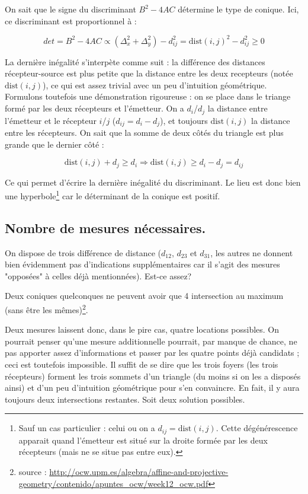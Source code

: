 \documentclass[10pt,a4paper]{article}
\begin{document}
On sait que le signe du discriminant $B^2 - 4AC$ détermine le type de conique. Ici, ce discriminant est proportionnel à :

\begin{equation}
det = B^2 - 4AC \propto (\Delta_x^2 + \Delta_y^2) - d_{ij}^2 = \mathrm{dist}(i,j)^2 - d_{ij}^2\geq 0
\end{equation}

La dernière inégalité s'interpète comme suit : la différence des distances récepteur-source est plus petite que la distance entre les deux recepteurs (notée $\mathrm{dist}(i,j)$), ce qui est assez trivial avec un peu d'intuition géométrique. Formulons toutefois une démonstration rigoureuse : on se place dans le triange formé par les deux récepteurs et l'émetteur. On a $d_i$/$d_j$ la distance entre l'émetteur et le récepteur $i$/$j$ ($d_{ij} = d_i - d_j$), et toujours $\mathrm{dist}(i,j)$ la distance entre les récepteurs. On sait que la somme de deux côtés du triangle est plus grande que le dernier côté :

\begin{equation}
\mathrm{dist}(i,j) + d_j \geq d_i \Rightarrow \mathrm{dist}(i,j) \geq d_i - d_j = d_{ij}
\end{equation}

Ce qui permet d'écrire la dernière inégalité du discriminant. Le lieu est donc bien une hyperbole\footnote{Sauf un cas particulier : celui ou on a $d_{ij} = \mathrm{dist}(i,j)$. Cette dégénérescence apparait quand l'émetteur est situé sur la droite formée par les deux récepteurs (mais ne se situe pas entre eux).} car le déterminant de la conique est positif.

\subsection{Nombre de mesures nécessaires.}
On dispose de trois différence de distance ($d_{12}$, $d_{23}$ et $d_{31}$, les autres ne donnent bien évidemment pas d'indications supplémentaires car il s'agit des mesures "opposées" à celles déjà mentionnées). Est-ce assez?

Deux coniques quelconques ne peuvent avoir que 4 intersection au maximum (sans être les mêmes)\footnote{source : \url{http://ocw.upm.es/algebra/affine-and-projective-geometry/contenido/apuntes_ocw/week12_ocw.pdf}}. 

Deux mesures laissent donc, dans le pire cas, quatre locations possibles. On pourrait penser qu'une mesure additionnelle pourrait, par manque de chance, ne pas apporter assez d'informations et passer par les quatre points déjà candidats ; ceci est toutefois impossible. Il suffit de se dire que les trois foyers (les trois récepteurs) forment les trois sommets d'un triangle (du moins si on les a disposés ainsi) et d'un peu d'intuition géométrique pour s'en convaincre. En fait, il y aura toujours deux intersections restantes. Soit deux solution possibles.
\end{document}

